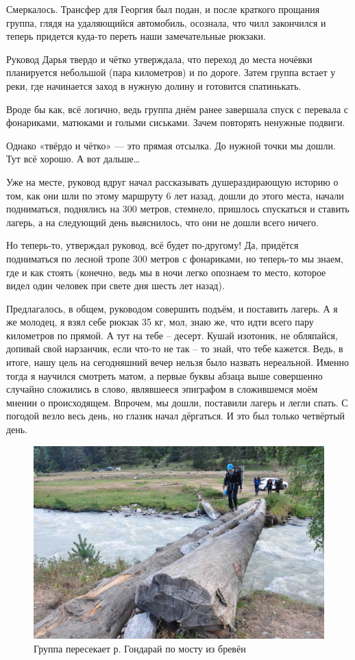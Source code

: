 Смеркалось. Трансфер для Георгия был подан, и после краткого прощания группа, глядя на удаляющийся автомобиль, осознала, что чилл закончился и теперь придется куда-то переть наши замечательные рюкзаки.

Руковод Дарья твердо и чётко утверждала, что переход до места ночёвки планируется небольшой (пара километров) и по дороге. Затем группа встает у реки, где начинается заход в нужную долину и готовится спатинькать.

Вроде бы как, всё логично, ведь группа днём ранее завершала спуск с перевала с фонариками, матюками и голыми сиськами. Зачем повторять ненужные подвиги. 

Однако «твёрдо и чётко» — это прямая отсылка. До нужной точки мы дошли. Тут всё хорошо. А вот дальше…

Уже на месте, руковод вдруг начал рассказывать душераздирающую историю о том, как они шли по этому маршруту 6 лет назад, дошли до этого места, начали подниматься, поднялись на 300 метров, стемнело, пришлось спускаться и ставить лагерь, а на следующий день выяснилось, что они не дошли всего ничего.

Но теперь-то, утверждал руковод, всё будет по-другому! Да, придётся подниматься по лесной тропе 300 метров с фонариками, но теперь-то мы знаем, где и как стоять (конечно, ведь мы в ночи легко опознаем то место, которое видел один человек при свете дня шесть лет назад).

Предлагалось, в общем, руководом совершить подъём, 
и поставить лагерь. А я же молодец, я взял себе рюкзак 35 кг, мол, знаю же, что идти всего пару километров по прямой. А тут на тебе – десерт. Кушай изотоник, не обляпайся, допивай свой нарзанчик, если что-то не так – то знай, что тебе кажется. Ведь, в итоге, нашу 
цель на сегодняшний вечер нельзя было назвать нереальной.
Именно тогда я научился смотреть матом, а первые буквы абзаца выше совершенно случайно сложились в слово, являвшееся эпиграфом в сложившемся моём мнении о происходящем.
Впрочем, мы дошли, поставили лагерь и легли спать. С погодой везло весь день, но глазик начал дёргаться. И это был только четвёртый день.


\begin{figure}[h]
	\centering
	\includegraphics[width=0.7\linewidth]{../pics/DSC_1167}
	\caption{Группа пересекает р. Гондарай по мосту из бревён}
	\label{fig:hondaray}
\end{figure}


\clearpage